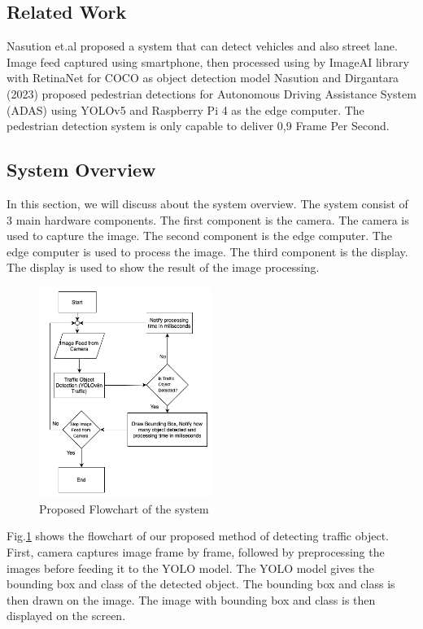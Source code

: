 \documentclass[conference]{IEEEtran}
\begin{document}
\subsection{Related Work}
Nasution et.al\cite{Road Information Collector} proposed a system that can detect vehicles and also street lane. Image feed captured using smartphone, then processed using by ImageAI library with RetinaNet for COCO as object detection model
Nasution and Dirgantara (2023) proposed pedestrian detections for Autonomous Driving Assistance System (ADAS) using YOLOv5 and Raspberry Pi 4 as the edge computer. The pedestrian detection system is only capable to deliver 0,9 Frame Per Second. 


\subsection{System Overview}
In this section, we will discuss about the system overview. The system consist of 3 main hardware components. 
The first component is the camera. The camera is used to capture the image.
The second component is the edge computer. The edge computer is used to process the image. 
The third component is the display. The display is used to show the result of the image processing.
\begin{figure}
\centering
\includegraphics[width=0.5\textwidth,keepaspectratio]{Proposed Flowchart.png}
\caption{Proposed Flowchart of the system}
\label{fig:flowchart}
\end{figure}
Fig.\ref{fig:flowchart} shows the flowchart of our proposed method of detecting traffic object. First, camera captures image frame by frame, followed by preprocessing the images before feeding it to the YOLO model.
The YOLO model gives the bounding box and class of the detected object. The bounding box and class is then drawn on the image. The image with bounding box and class is then displayed on the screen.
\end{document}
